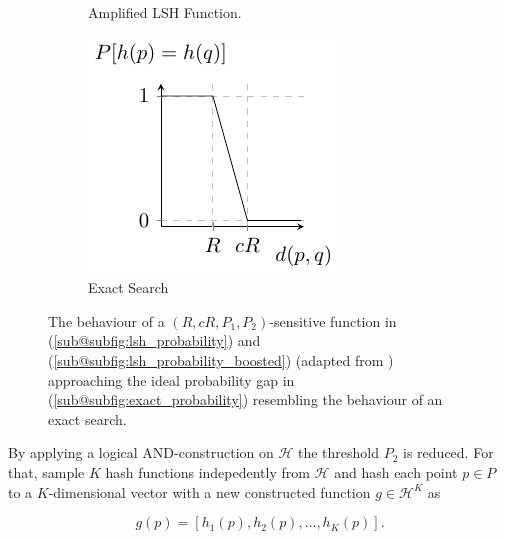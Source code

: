 \begin{figure}
\begin{subfigure}[b]{0.3\textwidth}
        \caption{Amplified LSH Function.}
        \label{subfig:lsh_probability_boosted}
        \end{subfigure}
        \hfill
        \begin{subfigure}[b]{0.3\textwidth}
            \centering
            \includegraphics[width=\textwidth]{tikz/exact_probability.pdf}
            \caption{Exact Search}
            \label{subfig:exact_probability}
    \end{subfigure}
    \caption{The behaviour of a $(R, cR, P_1, P_2)$-sensitive function in (\ref{sub@subfig:lsh_probability}) and (\ref{sub@subfig:lsh_probability_boosted}) (adapted from \cite[100]{leskovec_rajaraman_ullman_2014}) approaching the ideal probability gap in (\ref{sub@subfig:exact_probability}) resembling the behaviour of an exact search.}
    \label{fig:lsh_probability}
\end{figure}
   
By applying a logical AND-construction on $\mathcal{H}$ the threshold $P_2$ is reduced. For that, sample $K$ hash functions indepedently from $\mathcal{H}$ and hash each point $p \in P$ to a $K$-dimensional vector with a new constructed function $g \in \mathcal{H}^K$ as

\begin{equation}\label{eq:or_construction}
    g(p) = [h_1(p), h_2(p), \dots, h_K(p)].
\end{equation}

